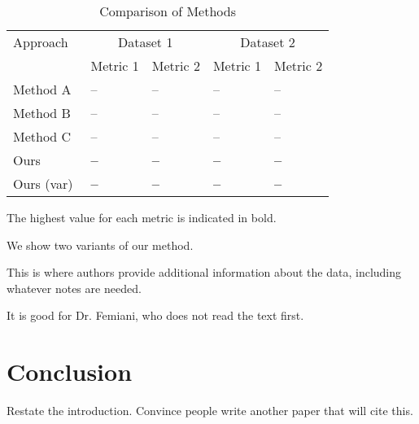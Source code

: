 \begin{table}[htbp]
    \centering
    \begin{threeparttable}
        \caption[Short Title for List of Table]{Comparison of Methods}
        \label{tab:results:comparison}
        \begin{tabular}{@{}lllll@{}}
            \toprule
            Approach  & \multicolumn{2}{c}{Dataset 1} & \multicolumn{2}{c}{Dataset 2} \\
             \cmidrule(lr){2-3} \cmidrule(lr){4-5}
                                  & Metric 1 & Metric 2 & Metric 1 & Metric 2\\ \midrule
            Method A~\cite{sample2019}     & --       & --        & --        & --        \\
            Method B~\cite{sample2019}     & --       & --        & --        & --        \\
            Method C~\cite{sample2019}     & --       & --       & --        & --        \\
            Ours     & \textbf{--}       & \textbf{--}       & \textbf{-- }       & \textbf{-- }       \\
            Ours (var)  & \textbf{--}       & \textbf{--}       & \textbf{-- }       & \textbf{-- }       \\
            \bottomrule
        \end{tabular}
        \begin{tablenotes}
            \small
            \item The highest value for each metric is indicated in bold.
            \item We show two variants of our method.
            \item This is where authors provide additional information about
            the data, including whatever notes are needed.
            \item It is good for Dr. Femiani, who does not read the text first.
        \end{tablenotes}
    \end{threeparttable}
\end{table}

\section{Conclusion}

Restate the introduction.
Convince people write another paper that will cite this.

